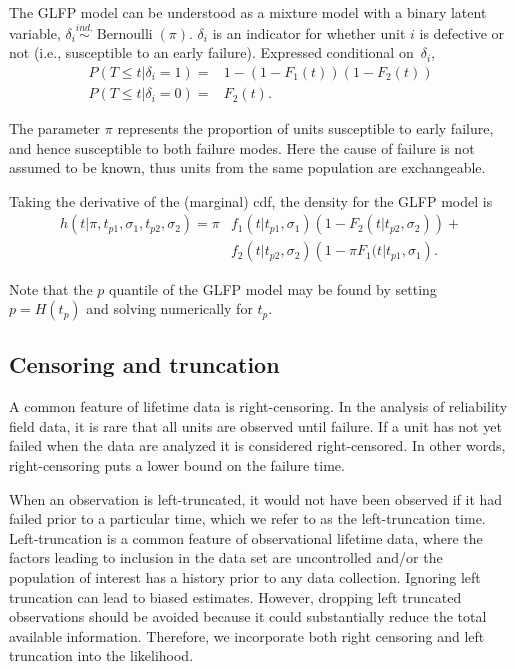 \documentclass[12pt]{article}
\newcommand{\ind}{\stackrel{ind.}{\sim}}
\newcommand{\op}{\operatorname}
\begin{document}
The GLFP model can be understood as a mixture model with a binary latent variable, $\delta_i\ind \op{Bernoulli}(\pi)$. $\delta_i$ is an indicator for whether unit $i$ is defective or not (i.e., susceptible to an early failure). Expressed conditional on~$\delta_i$,
\begin{align*}
P(T\le t | \delta_i=1) =& 1 -(1-F_1(t))(1-F_2(t))\\
P(T\le t | \delta_i=0) =& F_2(t).
\end{align*}

 
The parameter $\pi$ represents the proportion of units susceptible to early failure, and hence susceptible to both failure modes. Here the cause of failure is not assumed to be known, thus units from the same population are exchangeable.

Taking the derivative of the (marginal) cdf, the density for the GLFP model is
\begin{align*}
h(t|\pi, t_{p1},\sigma_1, t_{p2}, \sigma_2) = \pi & f_1(t|t_{p1},\sigma_1)\left(1-F_2(t|t_{p2},\sigma_2)\right) + \\ & f_2(t|t_{p2},\sigma_2)\left(1-\pi F_1(t|t_{p1},\sigma_1\right).
\end{align*}

\noindent Note that the $p$ quantile of the GLFP model may be found by setting $p=H(t_p)$ and solving numerically for $t_p$.

\subsection{Censoring and truncation}
A common feature of lifetime data is right-censoring. In the analysis of reliability field data, it is rare that all units are observed until failure. If a unit has not yet failed when the data are analyzed it is considered right-censored.  In other words, right-censoring puts a lower bound on the failure time.


When an observation is left-truncated, it would not have been observed if it had failed prior to a particular time, which we refer to as the left-truncation time.  Left-truncation is a common feature of observational lifetime data, where the factors leading to inclusion in the data set are uncontrolled and/or the population of interest has a history prior to any data collection. Ignoring left truncation can lead to biased estimates. However, dropping left truncated observations should be avoided because it could substantially reduce the total available information.  Therefore, we incorporate both right censoring and left truncation into the likelihood. 
\end{document}
